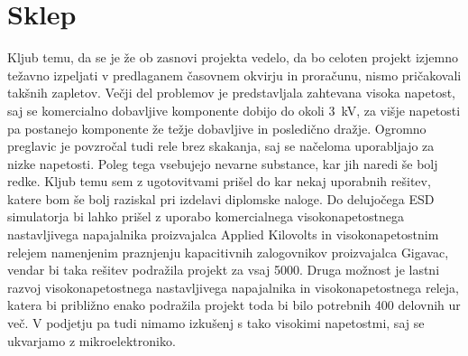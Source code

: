 \documentclass[a4paper,twoside,openright,12pt,Slovene]{book}
\begin{document}
\chapter{Sklep} \label{Sklep}

	Kljub temu, da se je že ob zasnovi projekta vedelo, da bo celoten projekt izjemno težavno izpeljati v predlaganem časovnem okvirju in proračunu, nismo pričakovali takšnih zapletov. Večji del problemov je predstavljala zahtevana visoka napetost, saj se komercialno dobavljive komponente dobijo do okoli \SI{3}{\kilo\volt}, za višje napetosti pa postanejo komponente že težje dobavljive in posledično dražje. Ogromno preglavic je povzročal tudi rele brez skakanja, saj se načeloma uporabljajo za nizke napetosti. Poleg tega vsebujejo nevarne substance, kar jih naredi še bolj redke. Kljub temu sem z ugotovitvami prišel do kar nekaj uporabnih rešitev, katere bom še bolj raziskal pri izdelavi diplomske naloge. Do delujočega ESD simulatorja bi lahko prišel z uporabo komercialnega visokonapetostnega nastavljivega napajalnika proizvajalca Applied Kilovolts in visokonapetostnim relejem namenjenim praznjenju kapacitivnih zalogovnikov proizvajalca Gigavac, vendar bi taka rešitev podražila projekt za vsaj 5000\texteuro. Druga možnost je lastni razvoj visokonapetostnega nastavljivega napajalnika in visokonapetostnega releja, katera bi približno enako podražila projekt toda bi bilo potrebnih 400 delovnih ur več. V podjetju pa tudi nimamo izkušenj s tako visokimi napetostmi, saj se ukvarjamo z mikroelektroniko.
	
	
	
	
 
\end{document}

